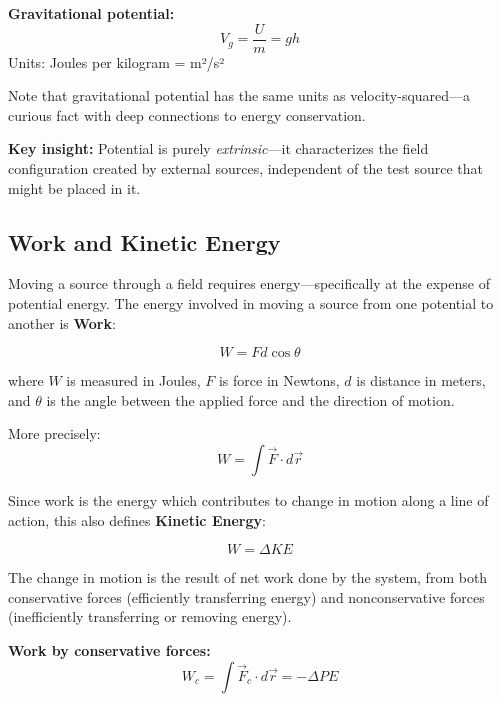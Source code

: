 \documentclass[
]{article}
\begin{document}
\textbf{Gravitational potential:} \[V_g = \frac{U}{m} = gh\] Units:
Joules per kilogram = m²/s²

Note that gravitational potential has the same units as
velocity-squared---a curious fact with deep connections to energy
conservation.

\begin{tcolorbox}[enhanced jigsaw, left=2mm, bottomrule=.15mm, titlerule=0mm, rightrule=.15mm, leftrule=.75mm, colframe=quarto-callout-important-color-frame, opacitybacktitle=0.6, colbacktitle=quarto-callout-important-color!10!white, bottomtitle=1mm, breakable, coltitle=black, toptitle=1mm, arc=.35mm, colback=white, title=\textcolor{quarto-callout-important-color}{\faExclamation}\hspace{0.5em}{Important}, opacityback=0, toprule=.15mm]

\textbf{Key insight:} Potential is purely \emph{extrinsic}---it
characterizes the field configuration created by external sources,
independent of the test source that might be placed in it.

\end{tcolorbox}

\subsection{Work and Kinetic Energy}\label{work-and-kinetic-energy}

Moving a source through a field requires energy---specifically at the
expense of potential energy. The energy involved in moving a source from
one potential to another is \textbf{Work}:

\[W = Fd\cos\theta\]

where \(W\) is measured in Joules, \(F\) is force in Newtons, \(d\) is
distance in meters, and \(\theta\) is the angle between the applied
force and the direction of motion.

More precisely: \[W = \int \vec{F} \cdot d\vec{r}\]

Since work is the energy which contributes to change in motion along a
line of action, this also defines \textbf{Kinetic Energy}:

\[W = \Delta KE\]

The change in motion is the result of net work done by the system, from
both conservative forces (efficiently transferring energy) and
nonconservative forces (inefficiently transferring or removing energy).

\textbf{Work by conservative forces:}
\[W_c = \int \vec{F}_c \cdot d\vec{r} = -\Delta PE\]
\end{document}
